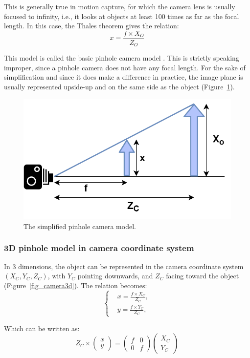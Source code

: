 This is generally true in motion capture, for which the camera lens is usually focused to infinity, i.e., it looks at objects at least 100 times as far as the focal length. In this case, the Thales theorem gives the relation:
\begin{equation}
  x=\frac{f\times X_O}{Z_O}
\end{equation}

This model is called the basic pinhole camera model \cite{Zhang2000,Hartley2003,Tomasi2017}. This is strictly speaking improper, since a pinhole camera does not have any focal length. For the sake of simplification and since it does make a difference in practice, the image plane is usually represented upside-up and on the same side as the object (Figure~\ref{fig_cameralens}). 

\begin{figure}[hbtp]
	\centering
	\def\svgwidth{\columnwidth}
	\fontsize{10pt}{10pt}\selectfont
	\includegraphics[width=0.5\linewidth]{"../Chap2/Figures/Camera_Lens.png"}
	\caption{The simplified pinhole camera model.} 
	\label{fig_cameralens}
\end{figure}


\FloatBarrier
\subsubsection{3D pinhole model in camera coordinate system}

In 3 dimensions, the object can be represented in the camera coordinate system $(X_C, Y_C, Z_C)$, with $Y_C$ pointing downwards, and $Z_C$ facing toward the object (Figure~\ref{fig_camera3d}). The relation becomes:
\begin{equation}
  \begin{cases}
  &x=\frac{f\times X_C}{Z_C},\\
  &y=\frac{f\times Y_C}{Z_C},
  \end{cases}
\end{equation}

Which can be written as:
\begin{equation}
  Z_C \times \begin{pmatrix}x\\y\end{pmatrix} 
  = \begin{pmatrix}f & 0 \\0 & f\end{pmatrix}\begin{pmatrix}X_C\\Y_C\end{pmatrix}
\end{equation}

